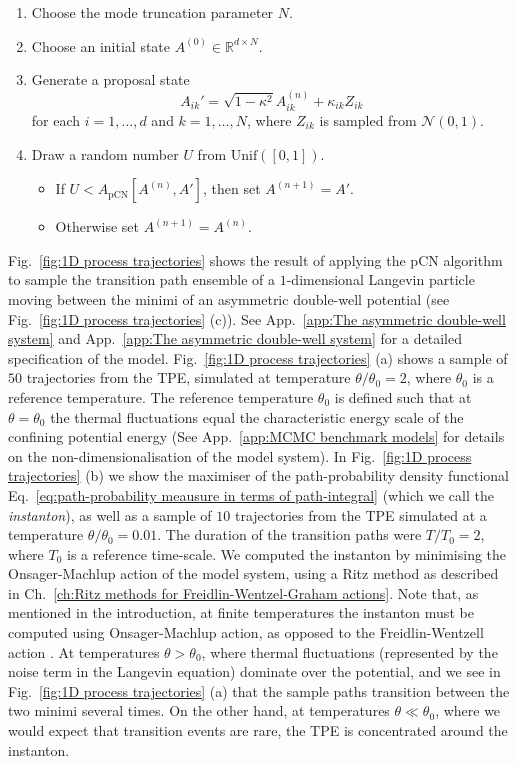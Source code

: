 \begin{enumerate}
	\item Choose the mode truncation parameter $N$.
	\item Choose an initial state $A^{(0)} \in \mathbb{R}^{d \times N}$.
	\item Generate a proposal state
		\begin{equation}
			A_{ik}' = \sqrt{1 - \kappa^2} A_{ik}^{(n)} + \kappa_{ik} Z_{ik}
		\end{equation}
		for each $i=1,\dots,d$ and $k = 1,\dots,N$, where $Z_{ik}$ is sampled from $\mathcal{N}(0,1)$.
	\item Draw a random number $U$ from $\text{Unif}([0,1])$.
		\begin{itemize}
			\item If $U < A_\text{pCN}[A^{(n)}, A']$, then set $A^{(n+1)} = A'$.
			\item Otherwise set $A^{(n+1)} = A^{(n)}$.
		\end{itemize}
\end{enumerate}
Fig.~\ref{fig:1D process trajectories} shows the result of applying the pCN algorithm to sample the transition path ensemble of a $1$-dimensional Langevin particle moving between the minimi of an asymmetric double-well potential (see Fig.~\ref{fig:1D process trajectories} (c)). See App.~\ref{app:The asymmetric double-well system} and App.~\ref{app:The asymmetric double-well system} for a detailed specification of the model. Fig.~\ref{fig:1D process trajectories} (a) shows a sample of $50$ trajectories from the TPE, simulated at temperature $\theta/\theta_0 = 2$, where $\theta_0$ is a reference temperature. The reference temperature $\theta_0$ is defined such that at $\theta = \theta_0$ the thermal fluctuations equal the characteristic energy scale of the confining potential energy (See App.~\ref{app:MCMC benchmark models} for details on the non-dimensionalisation of the model system). In Fig.~\ref{fig:1D process trajectories} (b) we show the maximiser of the path-probability density functional Eq.~\ref{eq:path-probability meausure in terms of path-integral} (which we call the \textit{instanton}), as well as a sample of $10$ trajectories from the TPE simulated at a temperature $\theta/\theta_0 = 0.01$. The duration of the transition paths were $T /T_0 = 2$, where $T_0$ is a reference time-scale. We computed the instanton by minimising the Onsager-Machlup action of the model system, using a Ritz method as described in Ch.~\ref{ch:Ritz methods for Freidlin-Wentzel-Graham actions}. Note that, as mentioned in the introduction, at finite temperatures the instanton must be computed using Onsager-Machlup action, as opposed to the Freidlin-Wentzell action \citep{gladrowExperimentalMeasurementRelative2021, adibStochasticActionsDiffusive2008}. At temperatures $\theta > \theta_0$, where thermal fluctuations (represented by the noise term in the Langevin equation) dominate over the potential, and we see in Fig.~\ref{fig:1D process trajectories} (a) that the sample paths transition between the two minimi several times. On the other hand, at temperatures $\theta \ll \theta_0$, where we would expect that transition events are rare, the TPE is concentrated around the instanton.

